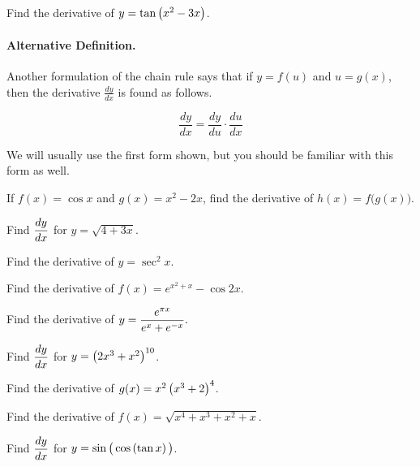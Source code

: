 \documentclass[12pt]{article}
\begin{document}
\Example Find the derivative of $y=\tan\left( x^2-3x\right)$.

\newpage

\paragraph{Alternative Definition.} Another formulation of the chain rule says that if $y=f(u)$ and $u=g(x)$, then the derivative $\frac{dy}{dx}$ is found as follows.

$$\frac{dy}{dx}=\frac{dy}{du}\cdot\frac{du}{dx}$$

\vspace{3mm}

We will usually use the first form shown, but you should be familiar with this form as well.

\vspace{5mm}

\Example If $f(x)=\cos x$ and $g(x)=x^2-2x$, find the derivative of $h(x)=f\big( g(x)\big)$.

\vspace{32mm}

\Example Find $\displaystyle\frac{dy}{dx}$ for $y=\sqrt{4+3x}$.

\vspace{32mm}

\Example Find the derivative of $y=\sec^2 x$. 

\vspace{32mm}

\Example Find the derivative of $f(x)= e^{x^2+x}-\cos 2x$.

\vspace{32mm}

\newpage

\Example Find the derivative of $y=\displaystyle\frac{e^{\pi x}}{e^x+e^{-x}}.$

\vspace{32mm}

\Example Find $\displaystyle\frac{dy}{dx}$ for $y=\left( 2x^3+x^2\right)^{10}$.

\vspace{32mm}

\Example Find the derivative of $g(x)=x^2\left( x^3+2\right) ^4$.

\vspace{32mm}

\Example Find the derivative of $f(x)=\sqrt{x^4+x^3+x^2+x}$.

\vspace{32mm}

\Example Find $\displaystyle\frac{dy}{dx}$ for $y=\sin\big(\cos\left( \tan x\right)\big)$.
\end{document}
